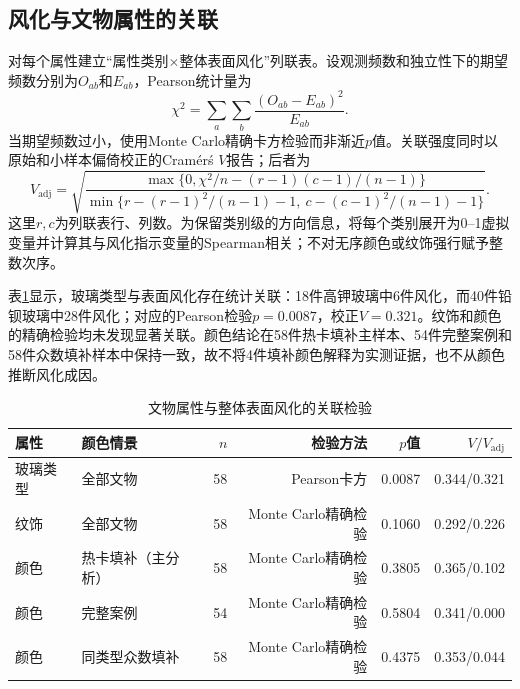\subsection{风化与文物属性的关联}

对每个属性建立“属性类别$\times$整体表面风化”列联表。设观测频数和独立性下的期望频数分别为$O_{ab}$和$E_{ab}$，Pearson统计量为
\begin{equation}
    \chi^2=\sum_a\sum_b\frac{(O_{ab}-E_{ab})^2}{E_{ab}}.
    \label{eq:p1-chi-square}
\end{equation}
当期望频数过小，使用Monte Carlo精确卡方检验而非渐近$p$值。关联强度同时以原始和小样本偏倚校正的Cram\'er\'s $V$报告；后者为
\begin{equation}
    V_{\mathrm{adj}}=
    \sqrt{\frac{\max\{0,\chi^2/n-(r-1)(c-1)/(n-1)\}}
    {\min\{r-(r-1)^2/(n-1)-1,\ c-(c-1)^2/(n-1)-1\}}}.
    \label{eq:p1-cramers-v}
\end{equation}
这里$r,c$为列联表行、列数。为保留类别级的方向信息，将每个类别展开为0--1虚拟变量并计算其与风化指示变量的Spearman相关；不对无序颜色或纹饰强行赋予整数次序。

表\ref{tab:p1-association}显示，玻璃类型与表面风化存在统计关联：18件高钾玻璃中6件风化，而40件铅钡玻璃中28件风化；对应的Pearson检验$p=0.0087$，校正$V=0.321$。纹饰和颜色的精确检验均未发现显著关联。颜色结论在58件热卡填补主样本、54件完整案例和58件众数填补样本中保持一致，故不将4件填补颜色解释为实测证据，也不从颜色推断风化成因。

\begin{table}[H]
    \centering
    \caption{文物属性与整体表面风化的关联检验}
    \label{tab:p1-association}
    \small
    \begin{tabular}{llrrrr}
        \toprule
        属性 & 颜色情景 & $n$ & 检验方法 & $p$值 & $V/V_{\mathrm{adj}}$ \\
        \midrule
        玻璃类型 & 全部文物 & 58 & Pearson卡方 & 0.0087 & 0.344/0.321 \\
        纹饰 & 全部文物 & 58 & Monte Carlo精确检验 & 0.1060 & 0.292/0.226 \\
        颜色 & 热卡填补（主分析） & 58 & Monte Carlo精确检验 & 0.3805 & 0.365/0.102 \\
        颜色 & 完整案例 & 54 & Monte Carlo精确检验 & 0.5804 & 0.341/0.000 \\
        颜色 & 同类型众数填补 & 58 & Monte Carlo精确检验 & 0.4375 & 0.353/0.044 \\
        \bottomrule
    \end{tabular}
\end{table}

